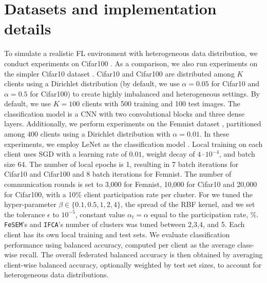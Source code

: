 \section{Datasets and implementation details} \label{app_details}

To simulate a realistic FL environment with heterogeneous data distribution, we conduct experiments on Cifar100 \citep{krizhevsky2009learning}. As a comparison, we also run experiments on the simpler Cifar10 dataset \cite{krizhevsky2009learning}. Cifar10 and Cifar100 are distributed among $K$ clients using a Dirichlet distribution (by default, we use $\alpha = 0.05$ for Cifar10 and $\alpha = 0.5$ for Cifar100) to create highly imbalanced and heterogeneous settings. By default, we use $K = 100$ clients with 500 training and 100 test images. The classification model is a CNN with two convolutional blocks and three dense layers. Additionally, we perform experiments on the Femnist dataset \cite{lecun1998mnist}, partitioned among $400$ clients using a Dirichlet distribution with $\alpha = 0.01$. In these experiments, we employ LeNet as the classification model \cite{lecun1998gradient}. Local training on each client uses SGD with a learning rate of $ 0.01$, weight decay of $4 \cdot 10^{-4}$, and batch size 64. The number of local epochs is 1, resulting in 7 batch iterations for Cifar10 and Cifar100 and 8 batch iterations for Femnist. The number of communication rounds is set to 3,000 for Femnist, 10,000 for Cifar10 and 20,000 for Cifar100, with a 10\% client participation rate per cluster. For \shortname we tuned the hyper-parameter $\beta \in \{0.1, 0.5, 1, 2, 4\}$, \ie the spread of the RBF kernel, and we set the tolerance $\epsilon$ to $10^{-5}$, constant value $\alpha_t = \alpha$ equal to the participation rate, \%. \texttt{FeSEM}'s and \texttt{IFCA}'s number of clusters was tuned between 2,3,4, and 5.  Each client has its own local training and test sets. We evaluate classification performance using balanced accuracy, computed per client as the average class-wise recall. The overall federated balanced accuracy is then obtained by averaging client-wise balanced accuracy, optionally weighted by test set sizes, to account for heterogeneous data distributions.

